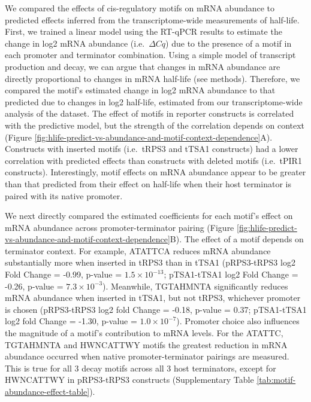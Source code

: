 \documentclass[../main.tex]{subfiles}
\begin{document}
We compared the effects of cis-regulatory motifs on mRNA abundance to predicted effects inferred from the transcriptome-wide measurements of half-life.
First, we trained a linear model using the RT-qPCR results to estimate the change in log2 mRNA abundance (i.e.~\(\Delta Cq\)) due to the presence of a motif in each promoter and terminator combination.
Using a simple model of transcript production and decay, we can argue that changes in mRNA abundance are directly proportional to changes in mRNA half-life (see methods).
Therefore, we compared the motif's estimated change in log2 mRNA abundance to that predicted due to changes in log2 half-life, estimated from our transcriptome-wide analysis of the \parencite{Chan2018} dataset.
The effect of motifs in reporter constructs is correlated with the predictive model, but the strength of the correlation depends on context (Figure \ref{fig:hlife-predict-vs-abundance-and-motif-context-dependence}A).
Constructs with inserted motifs (i.e.~tRPS3 and tTSA1 constructs) had a lower correlation with predicted effects than constructs with deleted motifs (i.e.~tPIR1 constructs).
Interestingly, motif effects on mRNA abundance appear to be greater than that predicted from their effect on half-life when their host terminator is paired with its native promoter.

We next directly compared the estimated coefficients for each motif's effect on mRNA abundance across promoter-terminator pairing (Figure \ref{fig:hlife-predict-vs-abundance-and-motif-context-dependence}B).
The effect of a motif depends on terminator context.
For example, ATATTCA reduces mRNA abundance substantially more when inserted in tRPS3 than in tTSA1 (pRPS3-tRPS3 log2 Fold Change = -0.99, p-value = \(1.5 \times 10^{-13}\); pTSA1-tTSA1 log2 Fold Change = -0.26, p-value = \(7.3 \times10^{-3}\)).
Meanwhile, TGTAHMNTA significantly reduces mRNA abundance when inserted in tTSA1, but not tRPS3, whichever promoter is chosen (pRPS3-tRPS3 log2 fold Change = -0.18, p-value = 0.37; pTSA1-tTSA1 log2 fold Change = -1.30, p-value = \(1.0 \times10^{-7}\)).
Promoter choice also influences the magnitude of a motif's contribution to mRNA levels.
For the ATATTC, TGTAHMNTA and HWNCATTWY motifs the greatest reduction in mRNA abundance occurred when native promoter-terminator pairings are measured.
This is true for all 3 decay motifs across all 3 host terminators, except for HWNCATTWY in pRPS3-tRPS3 constructs (Supplementary Table \ref{tab:motif-abundance-effect-table}).
\end{document}

